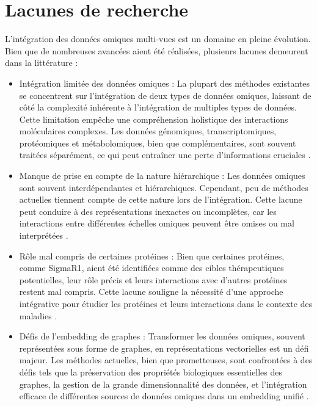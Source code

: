 \section{Lacunes de recherche}

L'intégration des données omiques multi-vues est un domaine en pleine évolution. Bien que de nombreuses avancées aient été réalisées, plusieurs lacunes demeurent dans la littérature :

\begin{itemize}
\item Intégration limitée des données omiques : La plupart des méthodes existantes se concentrent sur l'intégration de deux types de données omiques, laissant de côté la complexité inhérente à l'intégration de multiples types de données. Cette limitation empêche une compréhension holistique des interactions moléculaires complexes. Les données génomiques, transcriptomiques, protéomiques et métabolomiques, bien que complémentaires, sont souvent traitées séparément, ce qui peut entraîner une perte d'informations cruciales \cite{Huang2017}.

\item Manque de prise en compte de la nature hiérarchique : Les données omiques sont souvent interdépendantes et hiérarchiques. Cependant, peu de méthodes actuelles tiennent compte de cette nature lors de l'intégration. Cette lacune peut conduire à des représentations inexactes ou incomplètes, car les interactions entre différentes échelles omiques peuvent être omises ou mal interprétées \cite{Vahabi2022}.

\item Rôle mal compris de certaines protéines : Bien que certaines protéines, comme SigmaR1, aient été identifiées comme des cibles thérapeutiques potentielles, leur rôle précis et leurs interactions avec d'autres protéines restent mal compris. Cette lacune souligne la nécessité d'une approche intégrative pour étudier les protéines et leurs interactions dans le contexte des maladies \cite{Duan2021}.

\item Défis de l'embedding de graphes : Transformer les données omiques, souvent représentées sous forme de graphes, en représentations vectorielles est un défi majeur. Les méthodes actuelles, bien que prometteuses, sont confrontées à des défis tels que la préservation des propriétés biologiques essentielles des graphes, la gestion de la grande dimensionnalité des données, et l'intégration efficace de différentes sources de données omiques dans un embedding unifié \cite{btad353}.


\end{itemize}
